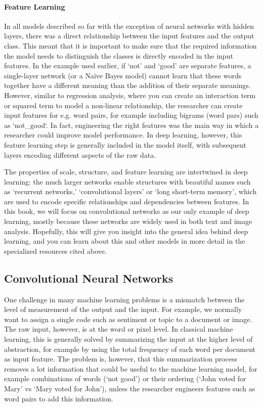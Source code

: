 \paragraph{Feature Learning}
In all models described so far with the exception of neural networks with hidden layers,
there was a direct relationship between the input features and the output class.
This meant that it is important to make sure that the required information the model needs to distinguish the classes
is directly encoded in the input features.
In the example used earlier, if `not' and `good' are separate features, a single-layer network (or a Na\"ive Bayes model)
cannot learn that these words together have a different meaning than the addition of their separate meanings.
However, similar to regression analysis, where you can create an interaction term or squared term to model a non-linear relationship,
the researcher can create input features for e.g. word pairs, for example including bigrams (word pars) such as `not\_good`.
In fact, engineering the right features was the main way in which a researcher could improve model performance.
In deep learning, however, this feature learning step is generally included in the model itself,
with subsequent layers encoding different aspects of the raw data.

The properties of scale, structure, and feature learning are intertwined in deep learning: the much larger networks enable structures with beautiful names such as `recurrent networks,' `convolutional layers' or `long short-term memory',
which are used to encode specific relationships and dependencies between features.
In this book, we will focus on convolutional networks as our only example of deep learning,
mostly because these networks are widely used in both text and image analysis.
Hopefully, this will give you insight into the general idea behind deep learning,
and you can learn about this and other models in more detail in the specialized resources cited above.  

\subsection{Convolutional Neural Networks}
\label{sec:cnnbasis}

One challenge in many machine learning problems is a mismatch between the level of measurement of the output and the input.
For example, we normally want to  assign a single code such as sentiment or topic to a document or image.
The raw input, however, is at the word or pixel level.
In classical machine learning, this is generally solved by summarizing the input at the higher level of abstraction,
for example by using the total frequency of each word per document as input feature.
The problem is, however, that this summarization process removes a lot information that could be useful to the machine learning model,
for example combinations of words (`not good') or their ordering (`John voted for Mary' vs `Mary voted for John'),
unless the researcher engineers features such as word pairs to add this information.

